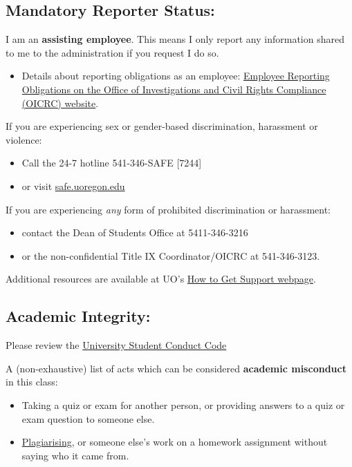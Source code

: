 \subsection*{Mandatory Reporter Status:}

I am an \textbf{assisting employee}.
This means I only report any information shared to me to the administration if you request I do so.

\begin{itemize}

\item Details about reporting obligations as an employee:  \href{https://investigations.uoregon.edu/employee-responsibilities}{Employee Reporting Obligations on the Office of Investigations and Civil Rights Compliance (OICRC) website}.

\end{itemize}

If you are experiencing sex or gender-based discrimination, harassment or violence:
\begin{itemize}
\item Call the 24-7 hotline 541-346-SAFE [7244]
\item or visit \href{https://safe.uoregon.edu/}{safe.uoregon.edu}
\end{itemize}

If you are experiencing \textit{any} form of prohibited discrimination or harassment:
\begin{itemize}
\item contact the Dean of Students Office at 5411-346-3216
\item or the non-confidential Title IX Coordinator/OICRC at 541-346-3123.
\end{itemize}

Additional resources are available at UO’s \href{https://investigations.uoregon.edu/how-get-support}{How to Get Support webpage}.

\subsection*{Academic Integrity:}
Please review the \href{https://policies.uoregon.edu/vol-3-administration-student-affairs/ch-1-conduct/student-conduct-code}{University Student Conduct Code}

A (non-exhaustive) list of acts which can be considered \textbf{academic misconduct} in this class:

\begin{itemize}
\item Taking a quiz or exam for another person, or providing answers to a quiz or exam question to someone else.
\item \href{https://researchguides.uoregon.edu/citing-plagiarism}{Plagiarising}, or someone else's work on a homework assignment without saying who it came from.
\end{itemize}

